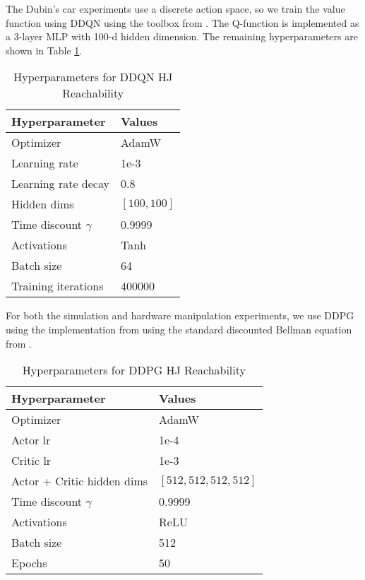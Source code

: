 The Dubin's car experiments use a discrete action space, so we train the value function using DDQN \cite{van2016deep} using the toolbox from \cite{hsu2021safety}. The Q-function is implemented as a 3-layer MLP with 100-d hidden dimension. The remaining hyperparameters are shown in Table \ref{tab:rarl}.
\begin{table}[h]
    \centering
    \begin{tabular}{l l}
        \toprule
        \textbf{Hyperparameter} & \textbf{Values}  \\
        \midrule
        Optimizer & AdamW \\
        Learning rate & 1e-3  \\
        Learning rate decay & 0.8 \\
        Hidden dims & $[100, 100]$ \\
        Time discount $\gamma $ & 0.9999 \\
        Activations & Tanh \\
        Batch size & 64 \\
        Training iterations & 400000 \\ 
    \bottomrule
    \end{tabular}
    \caption{Hyperparameters for DDQN HJ Reachability}
    \label{tab:rarl}
\end{table}

For both the simulation and hardware manipulation experiments, we use DDPG \cite{lillicrap2019continuouscontroldeepreinforcement} using the implementation from \cite{li2025certifiabledeeplearningreachability} using the standard discounted Bellman equation from \cite{fisac2019bridging}.

\begin{table}[h]
    \centering
    \begin{tabular}{l l}
        \toprule
        \textbf{Hyperparameter} & \textbf{Values}  \\
        \midrule
        Optimizer & AdamW \\
        Actor lr & 1e-4  \\
        Critic lr & 1e-3 \\
        Actor + Critic hidden dims & $[512, 512, 512, 512]$ \\
        Time discount $\gamma $ & 0.9999 \\
        Activations & ReLU \\
        Batch size & 512 \\
        Epochs & 50 \\ 
    \bottomrule
    \end{tabular}
    \caption{Hyperparameters for DDPG HJ Reachability}
    \label{tab:lcrl}
\end{table}

